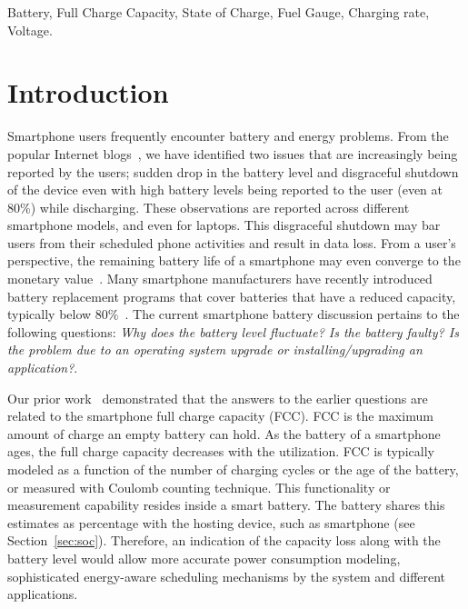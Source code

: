 \documentclass[journal]{IEEEtran}
\begin{document}
\begin{IEEEkeywords}
Battery, Full Charge Capacity, State of Charge, Fuel Gauge, Charging rate, Voltage.
\end{IEEEkeywords}






\IEEEpeerreviewmaketitle










\section{Introduction}






Smartphone users frequently encounter battery and energy problems. 
From the popular Internet blogs~\cite{nexus6,iphone5,andforum}, we have identified two issues that are increasingly being reported by the users; sudden drop in the battery level and disgraceful shutdown of the device even with high battery levels being reported to the user (even at 80\%) while discharging. These observations are reported across different smartphone models, and even for laptops. This disgraceful shutdown may bar users from their scheduled phone activities  and result in data loss. From a user's perspective, the remaining battery life of a smartphone may even converge to the monetary value~\cite{Hosio:2016}. Many smartphone manufacturers have recently introduced battery replacement programs that cover batteries that have a reduced capacity, typically below 80\%~\cite{breplacement1,applebat}. The current smartphone battery discussion pertains to the following questions: {\emph{Why does the battery level fluctuate? Is the battery faulty? Is the problem due to an operating system upgrade or installing/upgrading an application?}}.

Our prior work~\cite{mhotpower2015} demonstrated that the answers to the earlier questions are related to the smartphone full charge capacity (FCC).   FCC is the maximum amount of charge an empty battery can hold. As the battery of a smartphone ages, the full charge capacity decreases with the utilization. FCC is typically modeled as a function of the number of charging cycles or the age of the battery, or measured with Coulomb counting technique. This functionality or measurement capability resides inside a smart battery. The battery shares this estimates as percentage with the hosting device, such as smartphone (see Section~\ref{sec:soc}). Therefore, an indication of the capacity loss along with the battery level would allow more accurate power consumption modeling, sophisticated energy-aware scheduling mechanisms by the system and  different  applications. 
\end{document}
